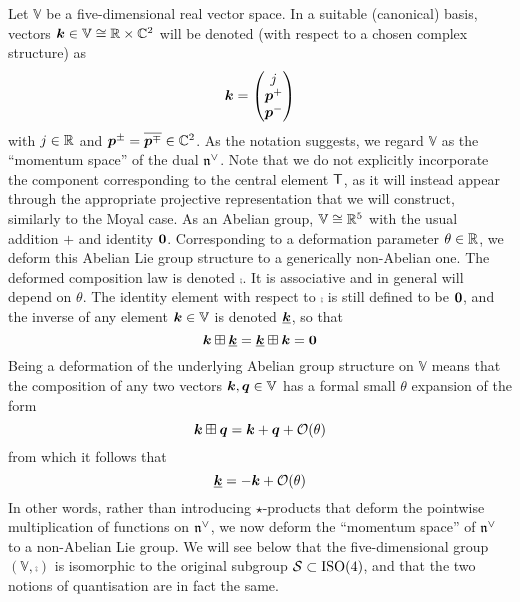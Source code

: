 Let $\mathbb{V}$ be a five-dimensional real vector space. In a suitable
(canonical) basis, vectors ${{\boldsymbol {k} }}\in\mathbb{V}\cong {\mathbb R}\times{\mathbb C}^2$ will be
denoted (with respect to a chosen complex structure) as
\begin{equation}
  \label{Svectors}
  {{\boldsymbol {k} }}=\begin{pmatrix}j\\{{\boldsymbol {p} }}^+ \\{{\boldsymbol {p} }}^-\end{pmatrix}
\end{equation}
with $j\in{\mathbb R}$ and ${{\boldsymbol {p} }}^\pm=\overline{{{\boldsymbol {p} }}^\mp}\in{\mathbb C}^2$. As the notation
suggests, we regard $\mathbb{V}$ as the ``momentum space'' of the dual
${\mathfrak n}^\vee$. Note that we do not explicitly incorporate the component
corresponding to the central element ${\sf T}$, as it will instead appear through the
appropriate projective representation that we will construct, similarly to the
Moyal case. As an Abelian group, $\mathbb{V}\cong{\mathbb R}^5$ with the usual addition
$+$ and identity ${\boldsymbol {0} }$. Corresponding to a deformation parameter
$\theta\in{\mathbb R}$, we deform this Abelian Lie group structure to a generically
non-Abelian one. The deformed composition law is denoted $\comp$. It is
associative and in general will depend on $\theta$. The identity element with
respect to $\comp$ is still defined to be ${\boldsymbol {0} }$, and the inverse of any
element ${{\boldsymbol {k} }}\in\mathbb{V}$ is denoted $\underline{{{\boldsymbol {k} }}}$, so that
\begin{equation}
  \label{compinverse}
  {{\boldsymbol {k} }}\boxplus\underline{{{\boldsymbol {k} }}}=\underline{{{\boldsymbol {k} }}}\boxplus{{\boldsymbol {k} }}={\boldsymbol {0} }
\end{equation}
Being a deformation of the underlying Abelian group structure on $\mathbb{V}$
means that the composition of any two vectors ${{\boldsymbol {k} }},{{\boldsymbol {q} }}\in\mathbb{V}$ has a
formal small $\theta$ expansion of the form
\begin{equation}
  \label{compsmalltheta}
  {{\boldsymbol {k} }}\boxplus{{\boldsymbol {q} }}={{\boldsymbol {k} }}+{{\boldsymbol {q} }}+{\mathcal O}(\theta)
\end{equation}
from which it follows that
\begin{equation}
  \label{compinvsmalltheta}
  \underline{{{\boldsymbol {k} }}}=-{{\boldsymbol {k} }}+{\mathcal O}(\theta)
\end{equation}
In other words, rather than introducing $\star$-products that deform the
pointwise multiplication of functions on ${\mathfrak n}^\vee$, we now deform the ``momentum
space'' of ${\mathfrak n}^\vee$ to a non-Abelian Lie group. We will see below that the
five-dimensional group $(\mathbb{V},\comp)$ is isomorphic to the original
subgroup $\mathcal{S}\subset{\rm ISO}(4)$, and that the two notions of
quantisation are in fact the same.

